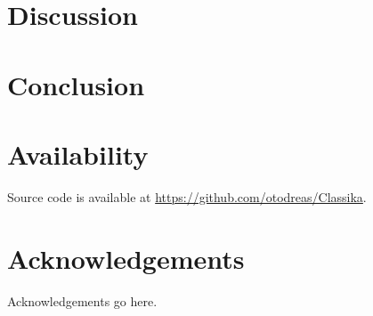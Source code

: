 \documentclass[10pt,twocolumn]{article}
\begin{document}
\section{Discussion}

\lipsum[5]

\section{Conclusion}

\lipsum[6]

\section*{Availability}

Source code is available at \url{https://github.com/otodreas/Classika}.

\section*{Acknowledgements}

Acknowledgements go here.


\end{document}
